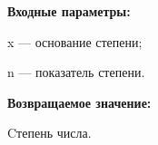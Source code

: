 \textbf{Входные параметры:}  
 
x --- основание степени;
 
n --- показатель степени.

\textbf{Возвращаемое значение:}

Cтепень числа.